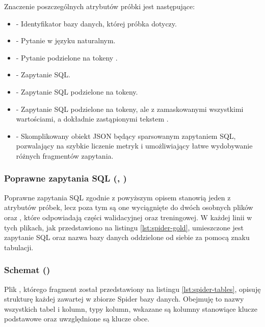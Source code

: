 Znaczenie poszczególnych atrybutów próbki jest następujące:
\begin{itemize}
    \item \textbf{} - Identyfikator bazy danych, której próbka dotyczy.
    \item \textbf{} - Pytanie w języku naturalnym.
    \item \textbf{} - Pytanie podzielone na tokeny .
    \item \textbf{} - Zapytanie SQL.
    \item \textbf{} - Zapytanie SQL podzielone na tokeny.
    \item \textbf{} - Zapytanie SQL podzielone na tokeny, ale z zamaskowanymi wszystkimi wartościami, a dokładnie zastąpionymi tekstem .
    \item \textbf{} - Skomplikowany obiekt JSON będący sparsowanym zapytaniem SQL, pozwalający na szybkie liczenie metryk i umożliwiający łatwe wydobywanie różnych fragmentów zapytania.
\end{itemize}

\subsubsection{Poprawne zapytania SQL (, )}
Poprawne zapytania SQL zgodnie z powyższym opisem stanowią jeden z atrybutów próbek, lecz poza tym są one wyciągnięte do dwóch osobnych plików  oraz , które odpowiadają części walidacyjnej oraz treningowej. W każdej linii w tych plikach, jak przedstawiono na listingu \ref{lst:spider-gold}, umieszczone jest zapytanie SQL oraz nazwa bazy danych oddzielone od siebie za pomocą znaku tabulacji.

\begin{minipage}{\linewidth}

\end{minipage}

\subsubsection{Schemat ()}
Plik , którego fragment został przedstawiony na listingu \ref{lst:spider-tables}, opisuję strukturę każdej zawartej w zbiorze Spider bazy danych. Obejmuję to nazwy wszystkich tabel i kolumn, typy kolumn, wskazane są kolumny stanowiące klucze podstawowe oraz uwzględnione są klucze obce.

